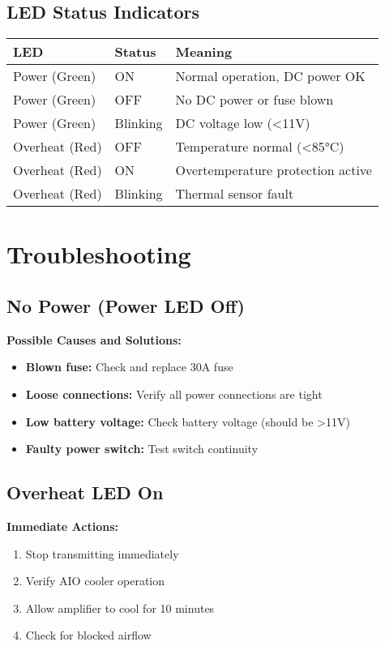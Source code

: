 \documentclass[11pt,a4paper]{article}
\begin{document}
\subsection{LED Status Indicators}

\begin{center}
\begin{tabular}{|l|l|l|}
\hline
\textbf{LED} & \textbf{Status} & \textbf{Meaning} \\
\hline
Power (Green) & ON & Normal operation, DC power OK \\
Power (Green) & OFF & No DC power or fuse blown \\
Power (Green) & Blinking & DC voltage low (<11V) \\
\hline
Overheat (Red) & OFF & Temperature normal (<85°C) \\
Overheat (Red) & ON & Overtemperature protection active \\
Overheat (Red) & Blinking & Thermal sensor fault \\
\hline
\end{tabular}
\end{center}

\section{Troubleshooting}

\subsection{No Power (Power LED Off)}
\textbf{Possible Causes and Solutions:}
\begin{itemize}
    \item \textbf{Blown fuse:} Check and replace 30A fuse
    \item \textbf{Loose connections:} Verify all power connections are tight
    \item \textbf{Low battery voltage:} Check battery voltage (should be >11V)
    \item \textbf{Faulty power switch:} Test switch continuity
\end{itemize}

\subsection{Overheat LED On}
\textbf{Immediate Actions:}
\begin{enumerate}
    \item Stop transmitting immediately
    \item Verify AIO cooler operation
    \item Allow amplifier to cool for 10 minutes
    \item Check for blocked airflow
\end{enumerate}
\end{document}
